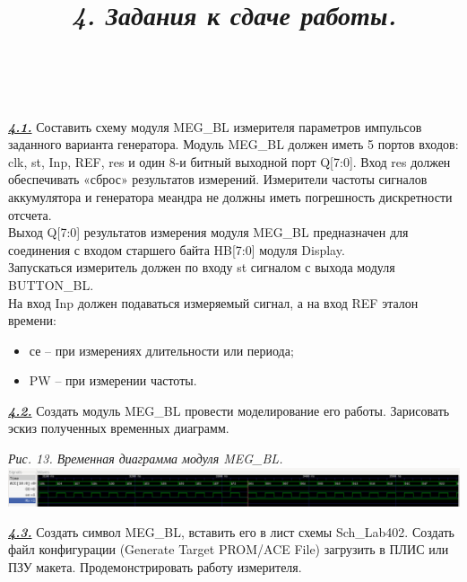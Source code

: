\documentclass[a4paper]{article}
\begin{document}
\title{\large{\textit{4. Задания к сдаче работы.}}}\\\\

\textbf{\textit{\underline{4.1.}}} Составить схему модуля MEG\_BL измерителя параметров импульсов заданного варианта генератора. Модуль MEG\_BL должен иметь 5 портов входов: clk, st, Inp, REF, res и один 8-и битный выходной порт Q[7:0]. Вход res должен обеспечивать «сброс»
результатов измерений. Измерители частоты сигналов аккумулятора и генератора меандра не должны иметь погрешность дискретности отсчета. \\
Выход Q[7:0] результатов измерения модуля MEG\_BL предназначен для соединения с входом старшего байта HB[7:0] модуля Display. \\
Запускаться измеритель должен по входу st сигналом с выхода модуля BUTTON\_BL. \\
На вход Inp должен подаваться измеряемый сигнал, а на вход REF эталон времени:
\begin{itemize}
	\item се – при измерениях длительности или периода;
	\item PW – при измерении частоты.
\end{itemize}

\textbf{\textit{\underline{4.2.}}} Создать модуль MEG\_BL провести моделирование его работы. Зарисовать эскиз полученных временных диаграмм.
\begin{center}
	\textit{Рис. 13. Временная диаграмма модуля MEG\_BL.}
	\includegraphics[scale=0.3]{../images/ACCM.png}
\end{center}

\textbf{\textit{\underline{4.3.}}} Создать символ MEG\_BL, вставить его в лист схемы Sch\_Lab402. Создать файл конфигурации (Generate Target PROM/ACE File) загрузить в ПЛИС или ПЗУ макета. Продемонстрировать работу измерителя.
\end{document}
